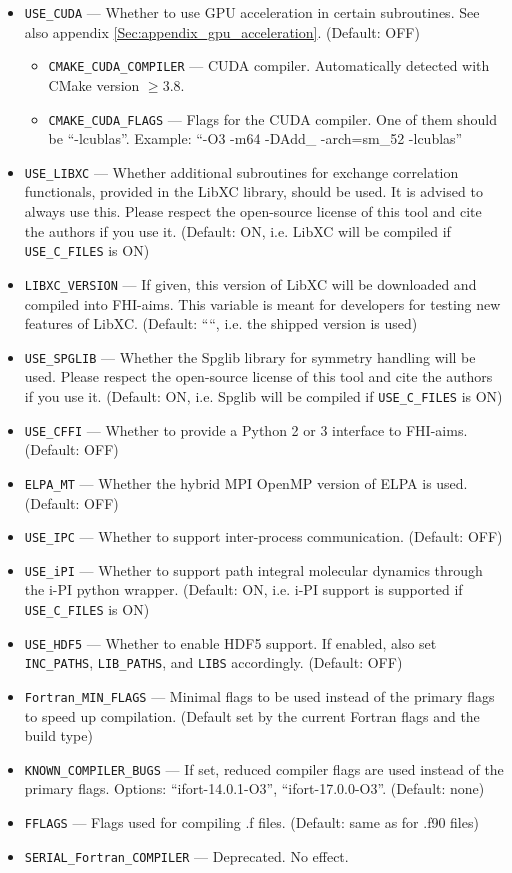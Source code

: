 \begin{itemize}
\item \texttt{USE\_CUDA} --- Whether to use GPU acceleration in certain subroutines. See also appendix \ref{Sec:appendix_gpu_acceleration}. (Default: OFF)
  \begin{itemize}
  \item \texttt{CMAKE\_CUDA\_COMPILER} --- CUDA compiler. Automatically detected with CMake version $\ge3.8$.
  \item \texttt{CMAKE\_CUDA\_FLAGS} --- Flags for the CUDA compiler. One of them should be ``-lcublas''. Example: ``-O3 -m64 -DAdd\_ -arch=sm\_52 -lcublas''
  \end{itemize}
\item \texttt{USE\_LIBXC} --- Whether additional subroutines for exchange correlation functionals, provided in the LibXC library, should be used. It is advised to always use this. Please respect the open-source license of this tool and cite the authors if you use it. (Default: ON, i.e. LibXC will be compiled if \texttt{USE\_C\_FILES} is ON)
\item \texttt{LIBXC\_VERSION} --- If given, this version of LibXC will be downloaded and compiled into FHI-aims. This variable is meant for developers for testing new features of LibXC. (Default: ````, i.e. the shipped version is used)
\item \texttt{USE\_SPGLIB} ---  Whether the Spglib library for symmetry handling will be used. Please respect the open-source license of this tool and cite the authors if you use it. (Default: ON, i.e. Spglib will be compiled if \texttt{USE\_C\_FILES} is ON)
\item \texttt{USE\_CFFI} --- Whether to provide a Python 2 or 3 interface to FHI-aims. (Default: OFF)
\item \texttt{ELPA\_MT} --- Whether the hybrid MPI OpenMP version of ELPA is used. (Default: OFF)
\item \texttt{USE\_IPC} --- Whether to support inter-process communication. (Default: OFF)
\item \texttt{USE\_iPI} --- Whether to support path integral molecular dynamics through the i-PI python wrapper. (Default: ON, i.e. i-PI support is supported if \texttt{USE\_C\_FILES} is ON)
\item \texttt{USE\_HDF5} --- Whether to enable HDF5 support. If enabled, also set \texttt{INC\_PATHS}, \texttt{LIB\_PATHS}, and \texttt{LIBS} accordingly. (Default: OFF)
\item \texttt{Fortran\_MIN\_FLAGS} --- Minimal flags to be used instead of the primary flags to speed up compilation. (Default set by the current Fortran flags and the build type)
\item \texttt{KNOWN\_COMPILER\_BUGS} --- If set, reduced compiler flags are used instead of the primary flags. Options: ``ifort-14.0.1-O3'', ``ifort-17.0.0-O3''. (Default: none)
\item \texttt{FFLAGS} --- Flags used for compiling .f files. (Default: same as for .f90 files)
\item \texttt{SERIAL\_Fortran\_COMPILER} --- Deprecated. No effect.
\end{itemize}
